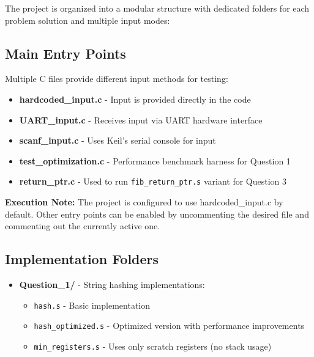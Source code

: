 \documentclass[a4paper,12pt]{article}
\newenvironment{sectionbox}[1]{%
    \tcolorbox[
        colback=titleblue!5,
        colframe=titleblue!50,
        arc=3mm,
        title=#1,
        fonttitle=\bfseries\sffamily,
        before skip=1.2em,
        after skip=1.2em
    ]
}{\endtcolorbox}
\begin{document}
\begin{sectionbox}{Project Structure}
The project is organized into a modular structure with dedicated folders for each problem solution and multiple input modes:

\subsection*{Main Entry Points}
Multiple C files provide different input methods for testing:
\begin{itemize}[leftmargin=2em, itemsep=0.5em]
    \item \textbf{hardcoded\_input.c} - Input is provided directly in the code
    \item \textbf{UART\_input.c} - Receives input via UART hardware interface
    \item \textbf{scanf\_input.c} - Uses Keil's serial console for input
    \item \textbf{test\_optimization.c} - Performance benchmark harness for Question 1
    \item \textbf{return\_ptr.c} - Used to run \texttt{fib\_return\_ptr.s} variant for Question 3
\end{itemize}


\begin{tcolorbox}[colback=titleblue!3,colframe=titleblue!30,arc=2mm]
\textbf{Execution Note:} The project is configured to use hardcoded\_input.c by default. Other entry points can be enabled by uncommenting the desired file and commenting out the currently active one.
\end{tcolorbox}


\subsection*{Implementation Folders}
\begin{itemize}[leftmargin=2em, itemsep=0.5em]
    \item \textbf{Question\_1/} - String hashing implementations:
    \begin{itemize}
        \item \texttt{hash.s} - Basic implementation
        \item \texttt{hash\_optimized.s} - Optimized version with performance improvements
        \item \texttt{min\_registers.s} - Uses only scratch registers (no stack usage)
    \end{itemize}


\end{itemize}
\end{sectionbox}
\end{document}
